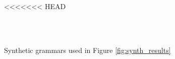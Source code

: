 \begin{figure}[htbp]
<<<<<<< HEAD
\begin{center}
 \\
 \\
\label{fig:synthetic_grammar}
\caption{Synthetic grammars used in Figure \ref{fig:synth_results}}
\end{center}

\end{figure}
